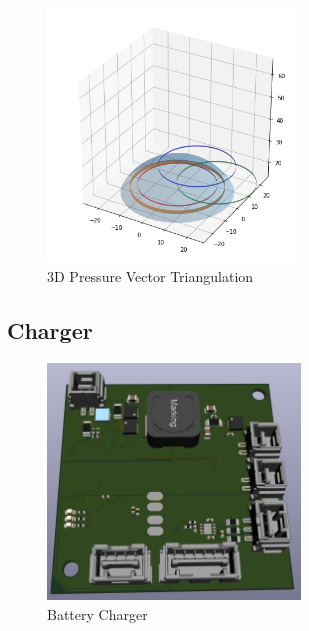 \begin{figure}[H]
    \centering
    \includegraphics[width=0.6\textwidth]{figures/Footsensordome.png}
    \caption{3D Pressure Vector Triangulation}
    \label{fig:3DPressureVectorTriangulation}
\end{figure}

\subsection{Charger}
\begin{figure}[H]
       \centering
       \includegraphics[width=0.6\textwidth]{figures/Charger.png}
       \caption{Battery Charger}
       \label{fig:ChargerPCB}
   \end{figure}


